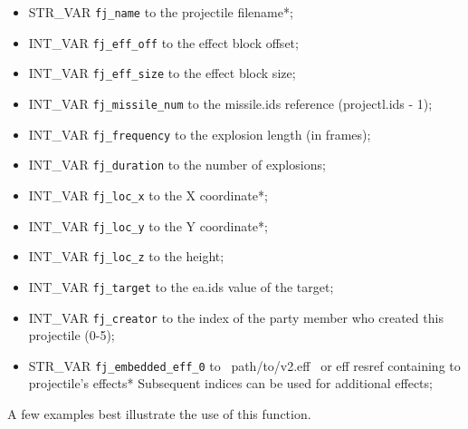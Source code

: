 \documentclass{article}
\begin{document}
\begin{itemize}
\item STR_VAR \verb+fj_name+ to the projectile filename*;
\item INT_VAR \verb+fj_eff_off+ to the effect block offset;
\item INT_VAR \verb+fj_eff_size+ to the effect block size;
\item INT_VAR \verb+fj_missile_num+ to the missile.ids reference (projectl.ids - 1);
\item INT_VAR \verb+fj_frequency+ to the explosion length (in frames);
\item INT_VAR \verb+fj_duration+ to the number of explosions;
\item INT_VAR \verb+fj_loc_x+ to the X coordinate*;
\item INT_VAR \verb+fj_loc_y+ to the Y coordinate*;
\item INT_VAR \verb+fj_loc_z+ to the height;
\item INT_VAR \verb+fj_target+ to the ea.ids value of the target;
\item INT_VAR \verb+fj_creator+ to the index of the party member who created this projectile (0-5);
\item STR_VAR \verb+fj_embedded_eff_0+ to ~path/to/v2.eff~ or eff resref containing to projectile's effects* Subsequent indices can be used for additional effects;
\end{itemize}
A few examples best illustrate the use of this function.
\end{document}
